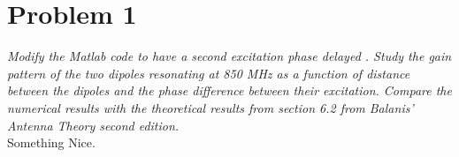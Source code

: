 \section{Problem 1}
\textit{ Modify the Matlab code to have a second excitation phase delayed . Study the gain pattern of the two dipoles resonating at 850 MHz as a function of distance between the dipoles and the phase difference between their excitation. Compare the numerical results with the theoretical results from section 6.2 from Balanis’ Antenna Theory second edition.}\\

Something Nice. 




